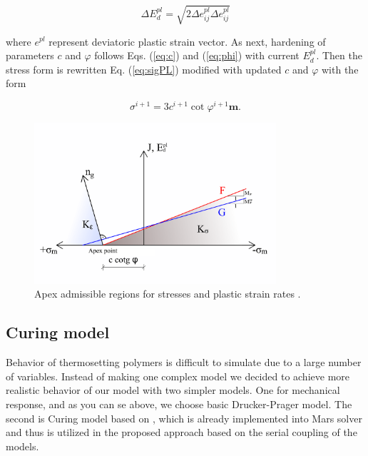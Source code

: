 \begin{equation}\label{eq:sig_i}
	\Delta E_d^{pl} = \sqrt{2\Delta e^{pl}_{ij}\Delta e^{pl}_{ij}}
\end{equation}

where $e^{pl}$ represent deviatoric plastic strain vector. As next, hardening of parameters $c$ and $\varphi$ follows Eqs. (\ref{eq:c}) and (\ref{eq:phi}) with current $E_d^{pl}$. Then the stress form is rewritten Eq. (\ref{eq:sigPL}) modified with updated $c$ and $\varphi$ with the form

\begin{equation}
	\sigma^{i+1} = 3c^{i+1} \cot \varphi^{i+1} \textbf{m}.
\end{equation}

\begin{figure}[h!]
	\centering  
	\includegraphics[width=0.8\textwidth, angle=0]{obrazky/apex_cones_my.png}
	\caption[Apex abmissible regions]{Apex admissible regions for stresses and plastic strain rates \cite{geofem}.} \label{obr:apex_cones}
\end{figure}

\subsection{Curing model}
\indent

Behavior of thermosetting polymers is difficult to simulate due to a large number of variables. Instead of making one complex model we decided to achieve more realistic behavior of our model with two simpler models. One for mechanical response, and as you can se above, we choose basic Drucker-Prager model. The second is Curing model based on \cite{heinrich2012generation}, which is already implemented into Mars solver \cite{mars} and thus is utilized in the proposed approach based on the serial coupling of the models. 

